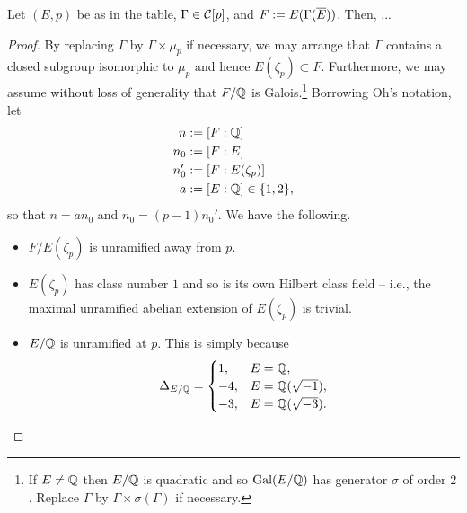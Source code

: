 \documentclass[11pt]{article}
\begin{document}
\begin{proposition}
Let $(E,p)$ be as in the table, $\Gamma\in\mathcal{C}[p]$, and $F:=E(\Gamma(\overline{E}))$. Then, ...
\end{proposition}

\begin{proof}
By replacing $\Gamma$ by $\Gamma\times\mu_p$ if necessary, we may arrange that $\Gamma$ contains a closed subgroup isomorphic to $\mu_p$ and hence $E(\zeta_p)\subset F$. Furthermore, we may assume without loss of generality that $F/\mathbb{Q}$ is Galois.\footnote{If $E\neq\mathbb{Q}$ then $E/\mathbb{Q}$ is quadratic and so $\operatorname{Gal}(E/\mathbb{Q})$ has generator $\sigma$ of order $2$. Replace $\Gamma$ by $\Gamma\times\sigma(\Gamma)$ if necessary.} Borrowing Oh's notation, let 
\begin{align*}
n&:=[F:\mathbb{Q}] \\
n_0&:=[F:E] \\
n_0'&:=[F:E(\zeta_p)] \\
a&:=[E:\mathbb{Q}]\in\{1,2\},
\end{align*}
so that $n=an_0$ and $n_0=(p-1)n_0'$. We have the following.
\begin{itemize}
\item $F/E(\zeta_p)$ is unramified away from $p$.

\item $E(\zeta_p)$ has class number $1$ and so is its own Hilbert class field -- i.e., the maximal unramified abelian extension of $E(\zeta_p)$ is trivial.

\item $E/\mathbb{Q}$ is unramified at $p$. This is simply because
\begin{equation*}
\Delta_{E/\mathbb{Q}}=
\begin{cases}
1, & E=\mathbb{Q}, \\
-4, & E=\mathbb{Q}(\sqrt{-1}), \\
-3, & E=\mathbb{Q}(\sqrt{-3}).
\end{cases}
\end{equation*}
\end{itemize}
\end{proof}
\end{document}
